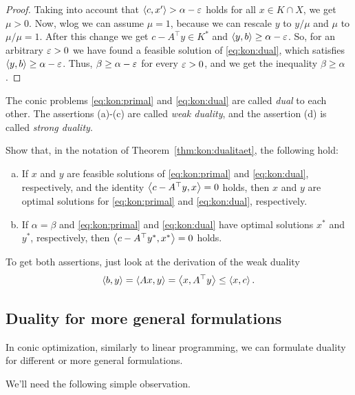 \begin{proof}
	Taking into account that $\left\langle c , x' \right\rangle > \alpha - {\operatorname{\varepsilon}}$  holds for all $x \in K \cap X$, we get $\mu > 0$. Now, wlog we can assume $\mu=1$, because we can rescale $y$  to $y/\mu$ and $\mu$ to $\mu/\mu =1$. After this change we get $c - A^\top y \in K^\ast$ and $\left\langle y , b \right\rangle \ge \alpha - {\operatorname{\varepsilon}}$. So, for an arbitrary ${\operatorname{\varepsilon}}>0$ we have found a feasible solution of  \eqref{eq:kon:dual}, which satisfies $\left\langle y , b \right\rangle \ge \alpha - {\operatorname{\varepsilon}}$. Thus, $\beta \ge \alpha - {\operatorname{\varepsilon}}$ for every ${\operatorname{\varepsilon}}> 0$, and we get the inequality $\beta \ge \alpha$.
\end{proof}

The conic problems \eqref{eq:kon:primal} and \eqref{eq:kon:dual} are called \emph{dual} to each other. The assertions (a)-(c) are called \emph{weak duality}, and the assertion (d) is called \emph{strong duality}. 

\begin{exercise}
	\label{compl:slackness}
	Show that, in the notation of  Theorem~\ref{thm:kon:dualitaet}, the following hold: 
	\begin{enumerate}[(a)]
		\item If $x$ and $y$ are feasible solutions of \eqref{eq:kon:primal} and \eqref{eq:kon:dual}, respectively, and the identity $\left\langle c -A^\top y , x \right\rangle = 0$ holds, then $x$ and $y$ are optimal solutions for \eqref{eq:kon:primal} and \eqref{eq:kon:dual}, respectively. 
		\item If $\alpha = \beta$ and \eqref{eq:kon:primal} and \eqref{eq:kon:dual} have optimal solutions $x^\ast$ and $y^\ast$, respectively, then $\left\langle c - A^\top y^\ast , x^\ast \right\rangle =0$ holds. 
	\end{enumerate}
\end{exercise}
\begin{solution}
	To get both assertions, just look at the derivation of the weak duality
	\[
		\left\langle b , y \right\rangle = \left\langle A x , y \right\rangle = \left\langle x , A^\top y \right\rangle \le \left\langle x , c \right\rangle.\qedhere
	\]
\end{solution}

\subsection{Duality for more general formulations}

In conic optimization, similarly to linear programming, we can formulate duality for different or more general formulations. 

We'll need the following simple observation. 

